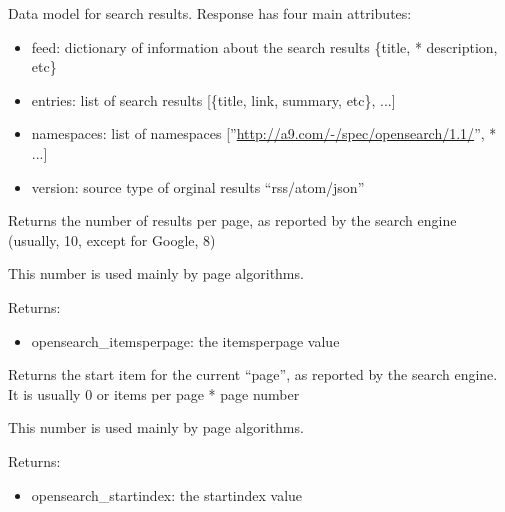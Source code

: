 \documentclass[letterpaper,10pt,english]{sphinxmanual}
\begin{document}
\begin{fulllineitems}
\label{api2.0:puppy.model.Response}
Data model for search results.  Response has four main attributes:
\begin{itemize}
\item {} 
feed: dictionary of information about the search results \{title,
* description, etc\}

\item {} 
entries: list of search results {[}\{title, link, summary, etc\}, ...{]}

\item {} 
namespaces: list of namespaces {[}''\href{http://a9.com/-/spec/opensearch/1.1/}{http://a9.com/-/spec/opensearch/1.1/}'',
* ...{]}

\item {} 
version: source type of orginal results ``rss/atom/json''

\end{itemize}

\begin{fulllineitems}
\label{api2.0:puppy.model.Response.get_itemsperpage}
Returns the number of results per page, as reported by the search engine (usually, 10, except for Google, 8)

This number is used mainly by page algorithms.

Returns:
\begin{itemize}
\item {} 
opensearch\_itemsperpage: the itemsperpage value

\end{itemize}

\end{fulllineitems}


\begin{fulllineitems}
\label{api2.0:puppy.model.Response.get_startindex}
Returns the start item for the current ``page'', as reported by the search engine. It is usually 0 or items per page * page number

This number is used mainly by page algorithms.

Returns:
\begin{itemize}
\item {} 
opensearch\_startindex: the startindex value


\end{itemize}
\end{fulllineitems}
\end{fulllineitems}
\end{document}
